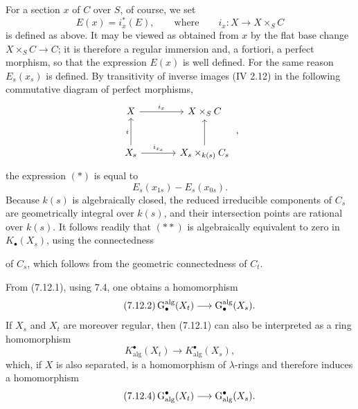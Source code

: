 For a section $x$ of $C$ over $S$, of course, we set
\[
E(x)=i_x^*(E),
\qquad\text{where}\qquad
i_x:X\longrightarrow X\times_SC
\]
is defined as above. It may be viewed as obtained from $x$ by the flat base
change $X\times_SC\to C$; it is therefore a regular immersion and, a
fortiori, a perfect morphism, so that the expression $E(x)$ is well defined.
For the same reason $E_s(x_s)$ is defined. By transitivity of inverse images
(IV 2.12) in the following commutative diagram of perfect morphisms,
\[
\begin{tikzcd}[column sep=large,row sep=large]
X \arrow[r,"i_x"] & X\times_SC\\
X_s \arrow[u,"i"] \arrow[r,"i_{x_s}"] &
X_s\times_{k(s)}C_s \arrow[u]
\end{tikzcd}
\;,
\]
the expression $(*)$ is equal to
\[
E_s(x_{1s})-E_s(x_{0s}).
\tag{**}
\]
Because $k(s)$ is algebraically closed, the reduced irreducible components
of $C_s$ are geometrically integral over $k(s)$, and their intersection
points are rational over $k(s)$. It follows readily that $(**)$ is
algebraically equivalent to zero in $K_\bullet(X_s)$, using the connectedness

of $C_s$, which follows from the geometric connectedness of $C_t$.

From (7.12.1), using 7.4, one obtains a homomorphism
\begin{equation}\tag{7.12.2}
\operatorname{G}_\bullet^{\mathrm{alg}}(X_t)
\longrightarrow \operatorname{G}_\bullet^{\mathrm{alg}}(X_s).
\end{equation}
If $X_s$ and $X_t$ are moreover regular, then (7.12.1) can also be
interpreted as a ring homomorphism
\begin{equation}\tag{7.12.3}
K^\bullet_{\mathrm{alg}}(X_t)
\longrightarrow K^\bullet_{\mathrm{alg}}(X_s),
\end{equation}
which, if $X$ is also separated, is a homomorphism of $\lambda$-rings and
therefore induces a homomorphism
\begin{equation}\tag{7.12.4}
\operatorname{G}^\bullet_{\mathrm{alg}}(X_t)
\longrightarrow \operatorname{G}^\bullet_{\mathrm{alg}}(X_s).
\end{equation}

